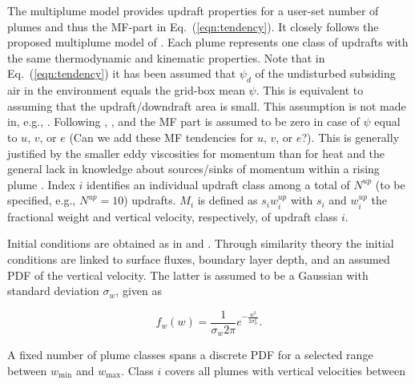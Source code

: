 \documentclass[dvipdfmx,a4paper,10pt]{article}
\begin{document}
The multiplume model provides updraft properties for a user-set number of plumes and thus the MF-part in Eq.~(\ref{eqn:tendency}). It closely follows the proposed multiplume model of \cite{cheinet03a}. Each plume represents one class of updrafts with the same thermodynamic and kinematic properties. Note that in Eq.~(\ref{eqn:tendency}) it has been assumed that $\psi_d$ of the undisturbed subsiding air in the environment equals the grid-box mean $\psi$. This is equivalent to assuming that the updraft/downdraft area is small. This assumption is not made in, e.g., \cite{cheinet03a}. Following \cite{suselj12}, \cite{suselj13}, and \cite{suselj14} the MF part is assumed to be zero in case of $\psi$ equal to $u$, $v$, or $e$ {\color{blue}(Can we add these MF tendencies for $u$, $v$, or $e$?)}. This is generally justified by the smaller eddy viscosities for momentum than for heat and the general lack in knowledge about sources/sinks of momentum within a rising plume \citep[see, e.g., discussion in][]{han15}. Index $i$ identifies an individual updraft class among a total of $N^{up}$ (to be specified, e.g., $N^{up}=10$) updrafts. $M_i$ is defined as $s_i w^{up}_i$ with $s_i$ and $w^{up}_i$ the fractional weight and vertical velocity, respectively, of updraft class $i$. 


Initial conditions are obtained as in \cite{cheinet03a} and \cite{lenschow80}. Through similarity theory the initial conditions are linked to surface fluxes, boundary layer depth, and an assumed PDF of the vertical velocity. The latter is assumed to be a Gaussian with standard deviation $\sigma_w$, given as

\begin{equation}
 f_w(w) = \frac{1}{\sigma_w 2 \pi } e^{-\frac{w^2}{2\sigma_w^2}}.
\end{equation}


A fixed number of plume classes spans a discrete PDF for a selected range between $w_{\mathrm{min}}$ and $w_{\mathrm{max}}$. Class $i$ covers all plumes with vertical velocities between
\end{document}
